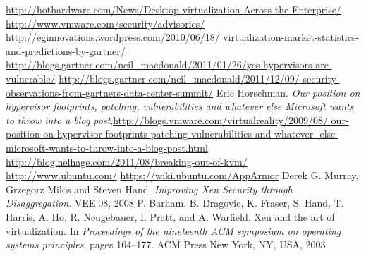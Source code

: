 {}
\begin{thebibliography}{99}
\url{http://hothardware.com/News/Desktop-virtualization-Across-the-Enterprise/}
 \url{http://www.vmware.com/security/advisories/}
\bibitem{} \url{http://eginnovations.wordpress.com/2010/06/18/
virtualization-market-statistics-and-predictions-by-gartner/}
 \url{http://blogs.gartner.com/neil\_macdonald/2011/01/26/yes-hypervisors-are-vulnerable/}
\bibitem{}
\url{http://blogs.gartner.com/neil\_macdonald/2011/12/09/
security-observations-from-gartners-data-center-summit/}
 Eric Horschman. \emph{Our position on hypervisor
footprints, patching, vulnerabilities and whatever else Microsoft wants to throw
into a blog post},\url{http://blogs.vmware.com/virtualreality/2009/08/
our-position-on-hypervisor-footprints-patching-vulnerabilities-and-whatever-
else-microsoft-wants-to-throw-into-a-blog-post.html}
 \url{http://blog.nelhage.com/2011/08/breaking-out-of-kvm/}
 \url{http://www.ubuntu.com/}
 \url{https://wiki.ubuntu.com/AppArmor}
 Derek G. Murray, Grzegorz Milos and Steven Hand.
\emph{Improving Xen Security through Disaggregation}. VEE’08, 2008
 P. Barham, B. Dragovic, K. Fraser, S. Hand, T. Harris, A. Ho, R.
Neugebauer, I. Pratt, and A. Warfield. Xen and the art of virtualization. In
\emph{Proceedings of the nineteenth ACM symposium on operating systems
principles}, pages 164–177. ACM Press New York, NY, USA, 2003.
\end{thebibliography}
